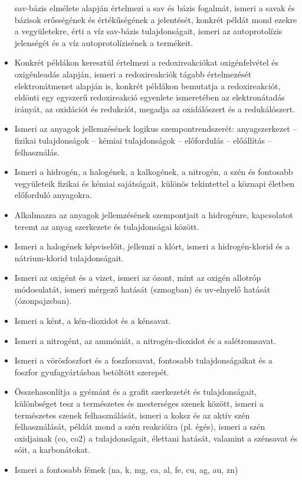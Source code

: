 \begin{itemize}
  sav-bázis elmélete alapján értelmezi a sav és bázis fogalmát, ismeri a
  savak és bázisok erősségének és értékűségének a jelentését, konkrét
  példát mond ezekre a vegyületekre, érti a víz sav-bázis
  tulajdonságait, ismeri az autoprotolízis jelenségét és a víz
  autoprotolízisének a termékeit.
\item
  Konkrét példákon keresztül értelmezi a redoxireakciókat oxigénfelvétel
  és oxigénleadás alapján, ismeri a redoxireakciók tágabb értelmezését
  elektronátmenet alapján is, konkrét példákon bemutatja a
  redoxireakciót, eldönti egy egyszerű redoxireakció egyenlete
  ismeretében az elektronátadás irányát, az oxidációt és redukciót,
  megadja az oxidálószert és a redukálószert.
\item
  Ismeri az anyagok jellemzésének logikus szempontrendszerét:
  anyagszerkezet -- fizikai tulajdonságok -- kémiai tulajdonságok --
  előfordulás -- előállítás -- felhasználás.
\item
  Ismeri a hidrogén, a halogének, a kalkogének, a nitrogén, a szén és
  fontosabb vegyületeik fizikai és kémiai sajátságait, különös
  tekintettel a köznapi életben előforduló anyagokra.
\item
  Alkalmazza az anyagok jellemzésének szempontjait a hidrogénre,
  kapcsolatot teremt az anyag szerkezete és tulajdonságai között.
\item
  Ismeri a halogének képviselőit, jellemzi a klórt, ismeri a
  hidrogén-klorid és a nátrium-klorid tulajdonságait.
\item
  Ismeri az oxigént és a vizet, ismeri az ózont, mint az oxigén allotróp
  módosulatát, ismeri mérgező hatását (szmogban) és uv-elnyelő hatását
  (ózonpajzsban).
\item
  Ismeri a ként, a kén-dioxidot és a kénsavat.
\item
  Ismeri a nitrogént, az ammóniát, a nitrogén-dioxidot és a
  salétromsavat.
\item
  Ismeri a vörösfoszfort és a foszforsavat, fontosabb tulajdonságaikat
  és a foszfor gyufagyártásban betöltött szerepét.
\item
  Összehasonlítja a gyémánt és a grafit szerkezetét és tulajdonságait,
  különbséget tesz a természetes és mesterséges szenek között, ismeri a
  természetes szenek felhasználását, ismeri a koksz és az aktív szén
  felhasználását, példát mond a szén reakcióira (pl. égés), ismeri a
  szén oxidjainak (co, co2) a tulajdonságait, élettani hatását, valamint
  a szénsavat és sóit, a karbonátokat.
\item
  Ismeri a fontosabb fémek (na, k, mg, ca, al, fe, cu, ag, au, zn)

\end{itemize}
